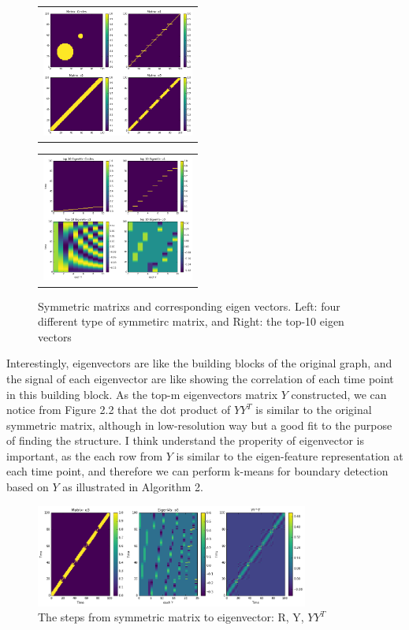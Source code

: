 \documentclass[final]{siamltexmm}
\begin{document}
\begin{figure}[H]
\centering
\begin{subfigure}
  \begin{tabular}{c}
  \includegraphics[width=50mm]{./figure/similarityMatrix.png}
  \end{tabular}{}
\end{subfigure}
  \begin{tabular}{c}
  \includegraphics[width=50mm]{./figure/similarityMatrix_eigens.png}
  \end{tabular}{}
\begin{subfigure}
\end{subfigure}
\caption{Symmetric matrixs and corresponding eigen vectors. Left: four different type of symmetirc matrix, and Right: the top-10 eigen vectors}
\end{figure}
Interestingly, eigenvectors are like the building blocks of the original graph, and the signal of each eigenvector are like showing the correlation of each time point in this building block. As the top-m eigenvectors matrix $Y$ constructed, we can notice from Figure 2.2 that the dot product of $YY^T$ is similar to the original symmetric matrix, although in low-resolution way but a good fit to the purpose of finding the structure. I think understand the properity of eigenvector is important, as the each row from $Y$ is similar to the eigen-feature representation at each time point, and therefore we can perform k-means for boundary detection based on $Y$ as illustrated in Algorithm 2.
\begin{figure}[H]
  \centering
    \includegraphics[width=0.8\textwidth]{./figure/o3_eachStage.png}
  \caption{The steps from symmetric matrix to eigenvector: R, Y, $YY^T$}
\end{figure}
\end{document}
